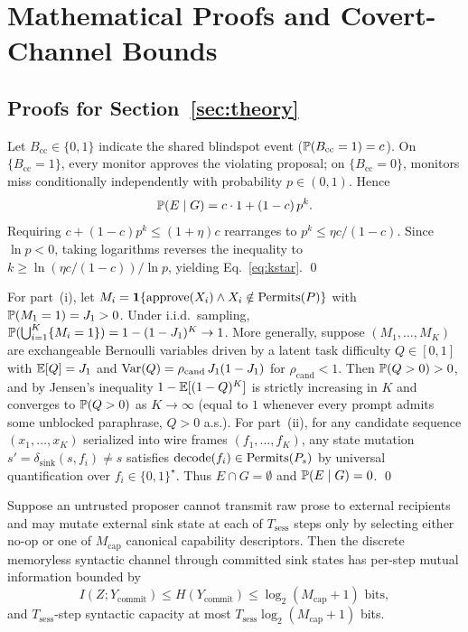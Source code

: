 \section{Mathematical Proofs and Covert-Channel Bounds}\label{app:proofs}

\subsection{Proofs for Section~\ref{sec:theory}}

Let \(B_{\mathrm{cc}} \in \{0,1\}\) indicate the shared blindspot event (\(\mathbb{P}(B_{\mathrm{cc}} = 1) = c\)). On \(\{B_{\mathrm{cc}} = 1\}\), every monitor approves the violating proposal; on \(\{B_{\mathrm{cc}} = 0\}\), monitors miss conditionally independently with probability \(p \in (0,1)\). Hence
\[
  \mathbb{P}(E \mid G) = c \cdot 1 + (1 - c)\,p^k.
\]
Requiring \(c + (1 - c)p^k \le (1 + \eta)c\) rearranges to \(p^k \le \eta c / (1 - c)\). Since \(\ln p < 0\), taking logarithms reverses the inequality to \(k \ge \ln(\eta c / (1 - c)) / \ln p\), yielding Eq.~\eqref{eq:kstar}. \qed

For part~(i), let \(M_i = \mathbf{1}\{\text{approve}(X_i) \wedge X_i \notin \operatorname{Permits}(P)\}\) with \(\mathbb{P}(M_1 = 1) = J_1 > 0\). Under i.i.d.\ sampling, \(\mathbb{P}(\bigcup_{i=1}^K \{M_i = 1\}) = 1 - (1 - J_1)^K \to 1\). More generally, suppose \((M_1,\dots,M_K)\) are exchangeable Bernoulli variables driven by a latent task difficulty \(Q \in [0,1]\) with \(\mathbb{E}[Q] = J_1\) and \(\operatorname{Var}(Q) = \rho_{\mathrm{cand}}\,J_1(1 - J_1)\) for \(\rho_{\mathrm{cand}} < 1\). Then \(\mathbb{P}(Q > 0) > 0\), and by Jensen's inequality \(1 - \mathbb{E}[(1 - Q)^K]\) is strictly increasing in \(K\) and converges to \(\mathbb{P}(Q > 0)\) as \(K \to \infty\) (equal to \(1\) whenever every prompt admits some unblocked paraphrase, \(Q > 0\) a.s.). For part~(ii), for any candidate sequence \((x_1,\dots,x_K)\) serialized into wire frames \((f_1,\dots,f_K)\), any state mutation \(s' = \delta_{\mathrm{sink}}(s, f_i) \neq s\) satisfies \(\operatorname{decode}(f_i) \in \operatorname{Permits}(P_s)\) by universal quantification over \(f_i \in \{0,1\}^\star\). Thus \(E \cap G = \emptyset\) and \(\mathbb{P}(E \mid G) = 0\). \qed

\begin{proposition}\label{prop:covert}
Suppose an untrusted proposer cannot transmit raw prose to external recipients and may mutate external sink state at each of \(T_{\mathrm{sess}}\) steps only by selecting either no-op or one of \(M_{\mathrm{cap}}\) canonical capability descriptors. Then the discrete memoryless syntactic channel through committed sink states has per-step mutual information bounded by
\begin{equation}\label{eq:covert}
  I(Z; Y_{\mathrm{commit}}) \le H(Y_{\mathrm{commit}}) \le \log_2(M_{\mathrm{cap}} + 1)\text{ bits},
\end{equation}
and \(T_{\mathrm{sess}}\)-step syntactic capacity at most \(T_{\mathrm{sess}}\log_2(M_{\mathrm{cap}} + 1)\) bits.
\end{proposition}

